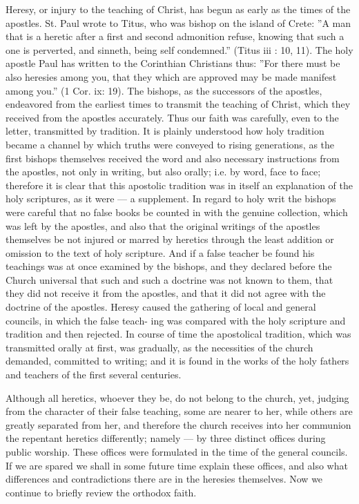 Heresy, or injury to the teaching of Christ, 
has begun as early as the times of the apostles. 
St. Paul wrote to Titus, who was bishop on the 
island of Crete: ''A man that is a heretic after 
a first and second admonition refuse, knowing 
that such a one is perverted, and sinneth, being
self condemned.'' (Titus iii : 10, 11). The holy 
apostle Paul has written to the Corinthian 
Christians thus: ''For there must be also heresies
among you, that they which are approved 
may be made manifest among you.'' (1 Cor. ix: 
19). The bishops, as the successors of the 
apostles, endeavored from the earliest times to 
transmit the teaching of Christ, which they received
from the apostles accurately. Thus our 
faith was carefully, even to the letter, transmitted
by tradition. It is plainly understood 
how holy tradition became a channel by which 
truths were conveyed to rising generations, as 
the first bishops themselves received the word 
and also necessary instructions from the 
apostles, not only in writing, but also orally; 
i.e. by word, face to face; therefore it is clear 
that this apostolic tradition was in itself an explanation
of the holy scriptures, as it were — a 
supplement. In regard to holy writ the bishops 
were careful that no false books be counted in 
with the genuine collection, which was left by 
the apostles, and also that the original writings 
of the apostles themselves be not injured or 
marred by heretics through the least addition or 
omission to the text of holy scripture. And 
if a false teacher be found his teachings was at
once examined by the bishops, and they declared
before the Church universal that such and 
such a doctrine was not known to them, that 
they did not receive it from the apostles, and 
that it did not agree with the doctrine of the 
apostles. Heresy caused the gathering of local 
and general councils, in which the false teach- 
ing was compared with the holy scripture and 
tradition and then rejected. In course of time 
the apostolical tradition, which was transmitted 
orally at first, was gradually, as the necessities 
of the church demanded, committed to writing; 
and it is found in the works of the holy fathers 
and teachers of the first several centuries. 

Although all heretics, whoever they be, do not 
belong to the church, yet, judging from the 
character of their false teaching, some are nearer 
to her, while others are greatly separated from 
her, and therefore the church receives into her 
communion the repentant heretics differently; 
namely — by three distinct offices during public 
worship. These offices were formulated in the 
time of the general councils. If we are spared 
we shall in some future time explain these offices,
and also what differences and contradictions
there are in the heresies themselves. Now 
we continue to briefly review the orthodox faith.

